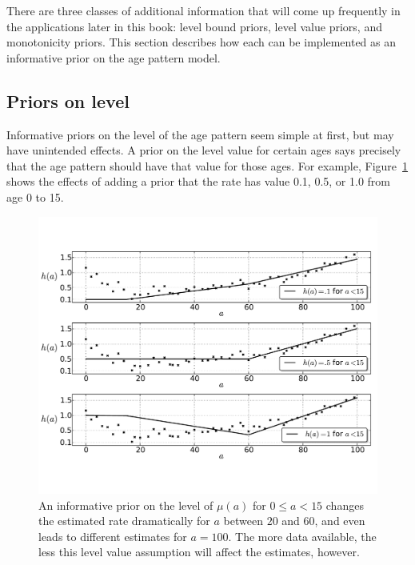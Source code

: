 There are three classes of additional information that will come up
frequently in the applications later in this book: level bound priors,
level value priors, and monotonicity priors. This section describes
how each can be implemented as an informative prior on the age pattern
model.


\subsection{Priors on level}

Informative priors on the level of the age pattern seem simple at
first, but may have unintended effects.  A prior on the level value
for certain ages says precisely that the age pattern should have that
value for those ages.  For example, Figure~\ref{level-value-priors} shows
the effects of adding a prior that the rate has value 0.1, 0.5, or 1.0
from age 0 to 15.


\begin{figure}[h]
\begin{center}
\includegraphics[width=\textwidth]{level_value-smoothing-splines.pdf}
\caption{An informative prior on the level of
$\mu(a)$ for $0 \leq a < 15$ changes the estimated rate dramatically
for $a$ between $20$ and $60$, and even leads to different estimates
for $a = 100$.  The more data available, the less this level value
assumption will affect the estimates, however.
}
\label{level-value-priors}
\end{center}
\end{figure}



